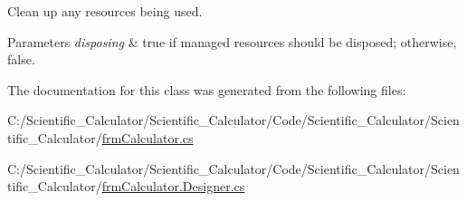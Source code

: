 Clean up any resources being used. 


\begin{DoxyParams}{Parameters}
{\em disposing} & true if managed resources should be disposed; otherwise, false.\\
\hline
\end{DoxyParams}


The documentation for this class was generated from the following files\+:\begin{DoxyCompactItemize}
\item 
C\+:/\+Scientific\+\_\+\+Calculator/\+Scientific\+\_\+\+Calculator/\+Code/\+Scientific\+\_\+\+Calculator/\+Scientific\+\_\+\+Calculator/\hyperlink{frm_calculator_8cs}{frm\+Calculator.\+cs}\item 
C\+:/\+Scientific\+\_\+\+Calculator/\+Scientific\+\_\+\+Calculator/\+Code/\+Scientific\+\_\+\+Calculator/\+Scientific\+\_\+\+Calculator/\hyperlink{frm_calculator_8_designer_8cs}{frm\+Calculator.\+Designer.\+cs}\end{DoxyCompactItemize}
